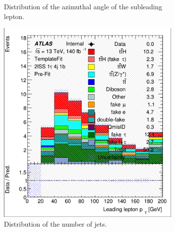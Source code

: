 \begin{figure}[htb!]
\begin{subfigure}{0.45\textwidth}
        \caption{Distribution of the azimuthal angle of the subleading lepton.}
        \label{fig:lep_Phi_1}
    \end{subfigure}

    \vspace{0.5cm}

    \begin{subfigure}{0.45\textwidth}
        \includegraphics[width=\linewidth]{figures/plots/histograms/njets.png}
        \caption{Distribution of the number of jets.}
        \label{fig:njets}
    \end{subfigure}\hfill%
    \begin{subfigure}{0.45\textwidth}

\end{subfigure}
\end{figure}

